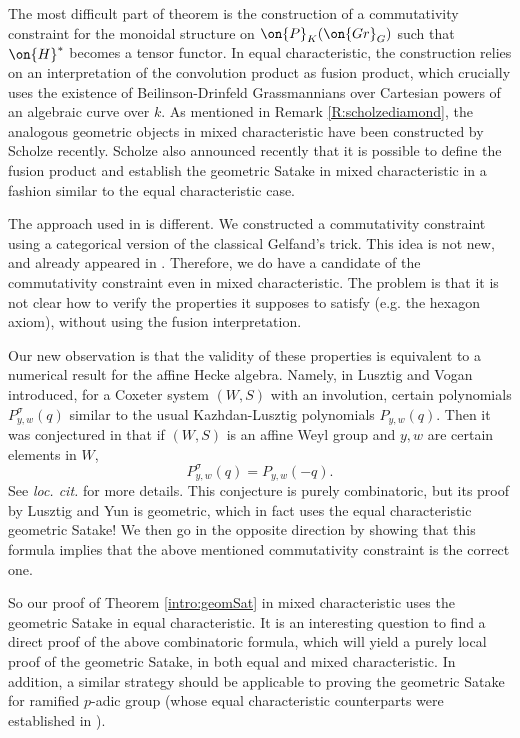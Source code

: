 \documentclass[11pt]{amsart}
\theoremstyle{definition}
\theoremstyle{definition}
\theoremstyle{definition}
\numberwithin{equation}{subsection}
\newcommand{\Gr}{{\on{Gr}}}
\begin{document}
The most difficult part of theorem is the construction of a commutativity constraint for the monoidal structure on $\on{P}_{K}(\Gr_G)$ such that $\on{H}^*$ becomes a tensor functor. In equal characteristic, the construction relies on an interpretation of the convolution product as fusion product, which crucially uses the existence of Beilinson-Drinfeld Grassmannians over Cartesian powers of an algebraic curve over $k$. As mentioned in Remark \ref{R:scholzediamond}, the analogous geometric objects in mixed characteristic have been constructed by Scholze recently. Scholze also announced recently that it is possible to define the fusion product and establish the geometric Satake in mixed characteristic in a fashion similar to the equal characteristic case. 

The approach used in \cite{Zh1} is different. We constructed a commutativity constraint using a categorical version of the classical Gelfand's trick. This idea is not new, and already appeared in \cite{Gi1}. Therefore, we do have a candidate of the commutativity constraint even in mixed characteristic. The problem is that it is not clear how to verify the properties it supposes to satisfy (e.g. the hexagon axiom), without using the fusion interpretation.

Our new observation is that the validity of these properties is equivalent to a numerical result for the affine Hecke algebra. Namely, in \cite{LV,Lu2} Lusztig and Vogan introduced, for a Coxeter system $(W,S)$ with an involution, certain polynomials $P^\sigma_{y,w}(q)$ similar to the usual Kazhdan-Lusztig polynomials $P_{y,w}(q)$. Then it was conjectured in \cite{Lu2} that if $(W,S)$ is an affine Weyl group and $y,w$ are certain elements in $W$,
\[P_{y,w}^\sigma(q)=P_{y,w}(-q).\]
See \emph{loc. cit.} for more details. This conjecture is purely combinatoric, but its proof by Lusztig and Yun \cite{LY} is geometric, which in fact uses the equal characteristic geometric Satake! We then go in the opposite direction by showing that this formula implies that the above mentioned commutativity constraint is the correct one.  

So our proof of Theorem \ref{intro:geomSat} in mixed characteristic uses the geometric Satake in equal characteristic. It is an interesting question to find a direct proof of the above combinatoric formula, which will yield a purely local proof of the geometric Satake, in both equal and mixed characteristic. In addition, a similar strategy should be applicable to proving the geometric Satake for ramified $p$-adic group (whose equal characteristic counterparts were established in \cite{Zh0, Ri}).
\end{document}
